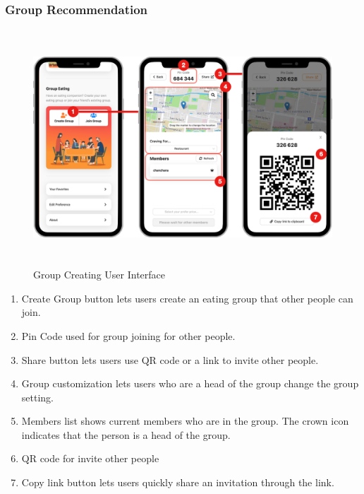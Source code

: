 \documentclass[12pt,oneside,openright,a4paper]{cpe-english-project}
\begin{document}
\newpage
\subsubsection{Group Recommendation}
\begin{figure}[H]\centering
\includegraphics[height=250pt]{./images/4ui_GroupCreatingUserInterface.png}
\caption{Group Creating User Interface}\label{fig:4ui_GroupCreatingUserInterface}
\end{figure}\vspace{-24pt}

\begin{enumerate}
\item Create Group button lets users create an eating group that other people can join.
\item Pin Code used for group joining for other people.
\item Share button lets users use QR code or a link to invite other people.
\item Group customization lets users who are a head of the group change the group setting.
\item Members list shows current members who are in the group. The crown icon indicates that the person is a head of the group.
\item QR code for invite other people
\item Copy link button lets users quickly share an invitation through the link.
\end{enumerate}
\end{document}
